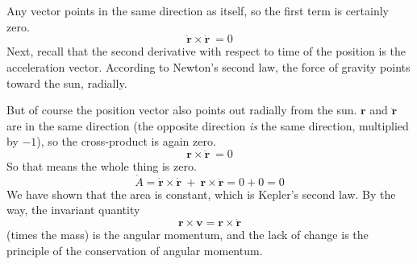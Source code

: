 \documentclass[11pt, oneside]{article}
\begin{document}
Any vector points in the same direction as itself, so the first term is certainly zero.  
\[ \dot{\mathbf{r}} \times \dot{\mathbf{r}} \ = 0 \]
Next, recall that the second derivative with respect to time of the position is the acceleration vector.  According to Newton's second law, the force of gravity points toward the sun, radially.  

But of course the position vector also points out radially from the sun.  $\mathbf{r}$ and $\ddot{\mathbf{r}}$ are in the same direction (the opposite direction \emph{is} the same direction, multiplied by $-1$), so the cross-product is again zero.
\[ \mathbf{r} \times \ddot{\mathbf{r}} \ = 0 \]
So that means the whole thing is zero.
\[ \dot A = \dot{\mathbf{r}} \times \dot{\mathbf{r}} \ + \ \mathbf{r} \times \ddot{\mathbf{r}} = 0 + 0 = 0  \]
We have shown that the area is constant, which is Kepler's second law.  By the way, the invariant quantity 
\[ \mathbf{r} \times \mathbf{v} = \mathbf{r} \times \dot{\mathbf{r}} \]
(times the mass) is the angular momentum, and the lack of change is the principle of the conservation of angular momentum.
\end{document}
